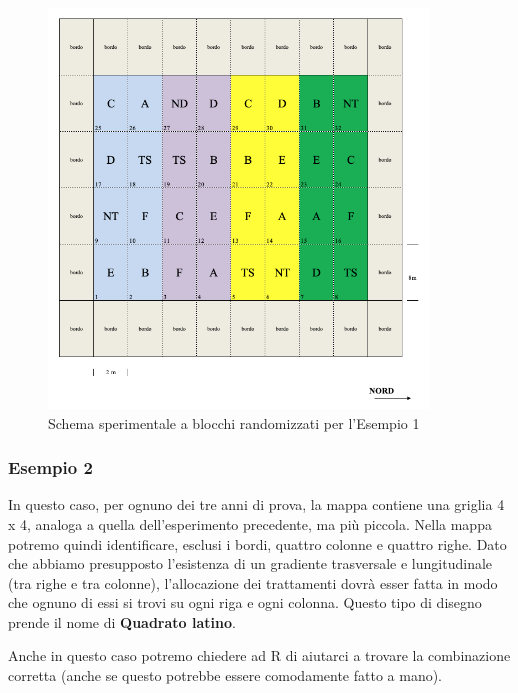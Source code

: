 \documentclass[a4paper,12pt,oneside]{book}
\newenvironment{Shaded}{\begin{snugshade}}{\end{snugshade}}
\newcommand{\KeywordTok}[1]{\textcolor[rgb]{0.13,0.29,0.53}{\textbf{#1}}}
\newcommand{\DataTypeTok}[1]{\textcolor[rgb]{0.13,0.29,0.53}{#1}}
\newcommand{\DecValTok}[1]{\textcolor[rgb]{0.00,0.00,0.81}{#1}}
\newcommand{\StringTok}[1]{\textcolor[rgb]{0.31,0.60,0.02}{#1}}
\newcommand{\OperatorTok}[1]{\textcolor[rgb]{0.81,0.36,0.00}{\textbf{#1}}}
\newcommand{\NormalTok}[1]{#1}
\begin{document}
\begin{figure}
\centering
\includegraphics[width=0.90000\textwidth]{_images/Mappa1CRBD.png}
\caption{Schema sperimentale a blocchi randomizzati per l'Esempio 1}
\end{figure}

\subsubsection{Esempio 2}\label{esempio-2-1}

In questo caso, per ognuno dei tre anni di prova, la mappa contiene una
griglia 4 x 4, analoga a quella dell'esperimento precedente, ma più
piccola. Nella mappa potremo quindi identificare, esclusi i bordi,
quattro colonne e quattro righe. Dato che abbiamo presupposto
l'esistenza di un gradiente trasversale e lungitudinale (tra righe e tra
colonne), l'allocazione dei trattamenti dovrà esser fatta in modo che
ognuno di essi si trovi su ogni riga e ogni colonna. Questo tipo di
disegno prende il nome di \textbf{Quadrato latino}.

Anche in questo caso potremo chiedere ad R di aiutarci a trovare la
combinazione corretta (anche se questo potrebbe essere comodamente fatto
a mano).

\begin{Shaded}
\end{Shaded}
\end{document}
